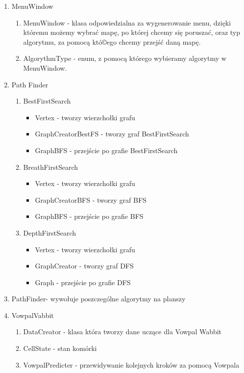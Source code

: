 \documentclass[12pt]{article}
\begin{document}
\begin{enumerate}
	\item MenuWindow
    		\begin{enumerate}[label=(\roman*)]
		\item MenuWindow - klasa odpowiedzialna za wygenerowanie menu, dzięki któremu możemy wybrać mapę, po której chcemy się poruszać, oraz typ algorytmu, za pomocą któ©ego chcemy przejść daną mapę.
		\item AlgorythmType - enum, z pomocą którego wybieramy algorytmy w MenuWindow.
		\end{enumerate}
	\item Path Finder
    		\begin{enumerate}[label=(\roman*)]
		\item BestFirstSearch
			\begin{itemize}
			\item Vertex - tworzy wierzchołki grafu
			\item GraphCreatorBestFS - tworzy graf BestFirstSearch
			\item GraphBFS - przejście po grafie BestFirstSearch
			\end{itemize}
		\item BreathFirstSearch
			\begin{itemize}
			\item Vertex - tworzy wierzchołki grafu
			\item GraphCreatorBFS - tworzy graf BFS
			\item GraphBFS - przejście po grafie BFS
			\end{itemize}
		\item DepthFirstSearch
			\begin{itemize}
			\item Vertex - tworzy wierzchołki grafu
			\item GraphCreator - tworzy graf DFS
			\item Graph - przejście po grafie DFS
			\end{itemize}
		\end{enumerate}
	\item PathFinder- wywołuje poszczególne algorytmy na planszy
	\item VowpalVabbit
		\begin{enumerate}[label=(\roman*)]
		\item DataCreator - klasa która tworzy dane uczące dla Vowpal Wabbit
		\item CellState - stan komórki
		\item VowpalPredicter - przewidywanie kolejnych kroków za pomocą Vowpala
		\end{enumerate}
\end{enumerate}
\newpage 
\end{document}
